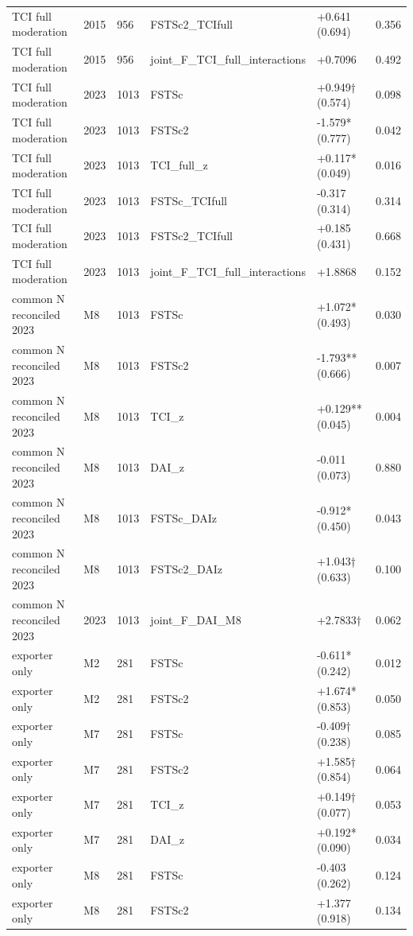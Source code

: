 \documentclass[12pt,a4paper]{article}
\begin{document}
\begin{longtable}[]{@{}llllll@{}}
TCI full moderation & 2015 & 956 & FSTSc2\_TCIfull & +0.641 (0.694) &
0.356 \\
TCI full moderation & 2015 & 956 & joint\_F\_TCI\_full\_interactions &
+0.7096 & 0.492 \\
TCI full moderation & 2023 & 1013 & FSTSc & +0.949† (0.574) & 0.098 \\
TCI full moderation & 2023 & 1013 & FSTSc2 & -1.579* (0.777) & 0.042 \\
TCI full moderation & 2023 & 1013 & TCI\_full\_z & +0.117* (0.049) &
0.016 \\
TCI full moderation & 2023 & 1013 & FSTSc\_TCIfull & -0.317 (0.314) &
0.314 \\
TCI full moderation & 2023 & 1013 & FSTSc2\_TCIfull & +0.185 (0.431) &
0.668 \\
TCI full moderation & 2023 & 1013 & joint\_F\_TCI\_full\_interactions &
+1.8868 & 0.152 \\
common N reconciled 2023 & M8 & 1013 & FSTSc & +1.072* (0.493) &
0.030 \\
common N reconciled 2023 & M8 & 1013 & FSTSc2 & -1.793** (0.666) &
0.007 \\
common N reconciled 2023 & M8 & 1013 & TCI\_z & +0.129** (0.045) &
0.004 \\
common N reconciled 2023 & M8 & 1013 & DAI\_z & -0.011 (0.073) &
0.880 \\
common N reconciled 2023 & M8 & 1013 & FSTSc\_DAIz & -0.912* (0.450) &
0.043 \\
common N reconciled 2023 & M8 & 1013 & FSTSc2\_DAIz & +1.043† (0.633) &
0.100 \\
common N reconciled 2023 & 2023 & 1013 & joint\_F\_DAI\_M8 & +2.7833† &
0.062 \\
exporter only & M2 & 281 & FSTSc & -0.611* (0.242) & 0.012 \\
exporter only & M2 & 281 & FSTSc2 & +1.674* (0.853) & 0.050 \\
exporter only & M7 & 281 & FSTSc & -0.409† (0.238) & 0.085 \\
exporter only & M7 & 281 & FSTSc2 & +1.585† (0.854) & 0.064 \\
exporter only & M7 & 281 & TCI\_z & +0.149† (0.077) & 0.053 \\
exporter only & M7 & 281 & DAI\_z & +0.192* (0.090) & 0.034 \\
exporter only & M8 & 281 & FSTSc & -0.403 (0.262) & 0.124 \\
exporter only & M8 & 281 & FSTSc2 & +1.377 (0.918) & 0.134 \\

\end{longtable}
\end{document}
